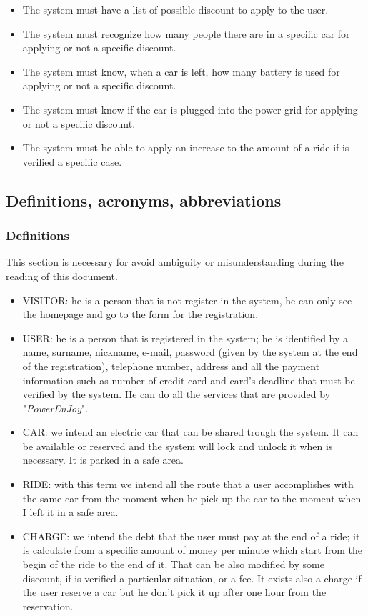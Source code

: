 \begin{itemize}
\item The system must have a list of possible discount to apply to the user.
\item The system must recognize how many people there are in a specific car for applying or not a specific discount.
\item The system must know, when a car is left, how many battery is used for applying or not a specific discount.
\item The system must know if the car is plugged into the power grid for applying or not a specific discount.
\item The system must be able to apply an increase to the amount of a ride if is verified a specific case.


\end{itemize}


\subsection{Definitions, acronyms, abbreviations} \label{subsec:def-ac-ab}

\subsubsection{Definitions} \label{def}
This section is necessary for avoid ambiguity or misunderstanding during the reading of this document. 
\begin{itemize}
\item VISITOR: he is a person that is not register in the system, he can only see the homepage and go to the form for the registration.
\item USER: he is a person that is registered in the system; he is identified by a name, surname, nickname, e-mail, password (given by the system at the end of the registration), telephone number, address and all the payment information such as number of credit card and card's deadline that must be verified by the system. He can do all the services that are provided by "\emph{PowerEnJoy}".
\item CAR: we intend an electric car that can be shared trough the system. It can be available or reserved and the system will lock and unlock it when is necessary. It is parked in a safe area.
\item RIDE: with this term we intend all the route that a user accomplishes with the same car from the moment when he pick up the car to the moment when I left it in a safe area.   
\item CHARGE: we intend the debt that the user must pay at the end of a ride; it is calculate from a specific amount of money per minute which start from the begin of the ride to the end of it. That can be also modified  by some discount, if is verified a particular situation, or a fee. It exists also a charge if the user reserve a car but he don't pick it up after one hour from the reservation.  

\end{itemize}

